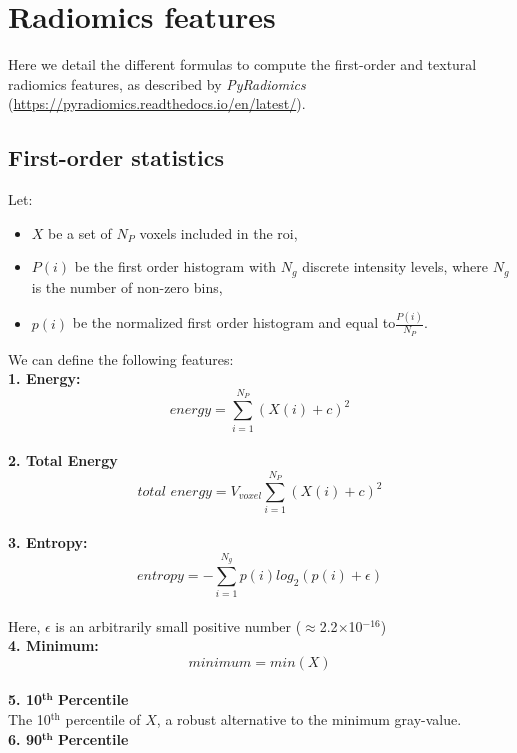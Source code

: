 \chapter{Radiomics features}\label{appendix---radiomicsFeatures}

Here we detail the different formulas to compute the first-order and textural radiomics features, as described by \textit{PyRadiomics} (\url{https://pyradiomics.readthedocs.io/en/latest/}).

\newcommand*\mean[1]{\overline{#1}}

\section{First-order statistics}

Let:
\begin{itemize}
\item $X$ be a set of $N_{P}$ voxels included in the \ac{roi},
\item 
 $P\left(i\right)$ be the first order histogram with $N_{g}$ discrete intensity levels, where $N_{g}$ is the number of non-zero bins,
\item $p\left(i\right)$ be the normalized first order histogram and equal to$\frac{P\left(i\right)}{N_{P}}$.
\end{itemize}
We can define the following features: \\
\textbf{1. Energy:}\\
\[\textit{energy}=\sum _{i=1}^{N_{P}}\left(X\left(i\right)+c\right)^{2}\]\\
\textbf{2. Total Energy}\\
\[\textit{total energy}=V_{\textit{voxel}}\sum _{i=1}^{N_{P}}\left(X\left(i\right)+c\right)^{2}\] \\
\textbf{3. Entropy:}\\
\[\textit{entropy}=-\sum _{i=1}^{N_{g}}p\left(i\right)log_{2}\left(p\left(i\right)+\epsilon \right)\] \\
Here, $\epsilon $ is an arbitrarily small positive number (${\approx}$2.2${\times}$10$^{-16}$) \\
\textbf{4. Minimum:}\\
\[\textit{minimum}=min \left(X\right)\]\\
\textbf{5. 10}$^{\mathbf{th}}$ \textbf{Percentile}\\
The 10$^{\mathrm{th}}$ percentile of $X$, a robust alternative to the minimum gray-value.\\
\textbf{6. 90}$^{\mathbf{th}}$ \textbf{Percentile}\\

